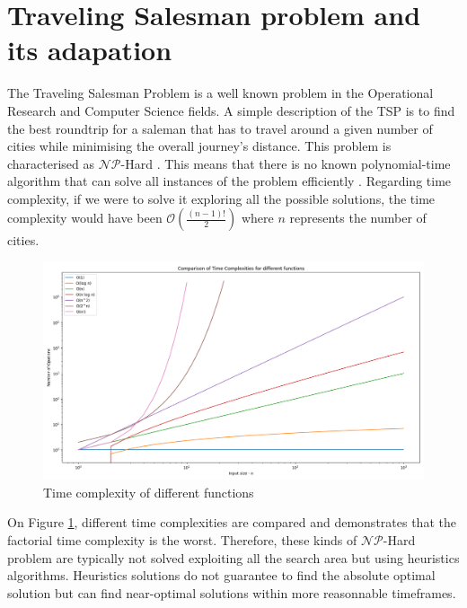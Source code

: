 


\newpage
\section{Traveling Salesman problem and its adapation}
\label{sec:TSP}

The Traveling Salesman Problem is a well known problem in the Operational Research and Computer Science fields. A simple description of the TSP is to find the best roundtrip for a saleman that has to travel around a given number of cities while minimising the overall journey's distance.
This problem is characterised as $\mathcal{NP}$-Hard \cite{np_hardness}. This means that there is no known polynomial-time algorithm that can solve all instances of the problem efficiently . Regarding time complexity, if we were to solve it exploring all the possible solutions, the time complexity would have been $\mathcal{O}(\frac{(n-1)!}{2})$ where $n$ represents the number of cities.

\begin{figure}[!ht]
    \centering
    \includegraphics[width=1\textwidth]{Figures/Time_complexities.png}
    \caption{Time complexity of different functions}
    \label{fig:time_complexity_comparisons}
\end{figure}

On Figure \ref{fig:time_complexity_comparisons}, different time complexities are compared and demonstrates that the factorial time complexity is the worst. Therefore, these kinds of $\mathcal{NP}$-Hard problem are typically not solved exploiting all the search area but using heuristics algorithms. Heuristics solutions do not guarantee to find the absolute optimal solution but can find near-optimal solutions within more reasonnable timeframes.

